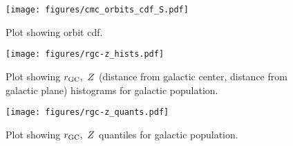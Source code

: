 \documentclass[twocolumn]{aastex631}
\begin{document}
\begin{figure}
    \begin{centering}
        \texttt{[image: figures/cmc\_orbits\_cdf\_S.pdf]}
        \caption{
            Plot showing orbit cdf.
        }
        \label{fig:cmc_orbits_cdf}
    \end{centering}
\end{figure}

\begin{figure}
    \begin{centering}
        \texttt{[image: figures/rgc-z\_hists.pdf]}
        \caption{
            Plot showing $r_{\rm GC},\ Z$ (distance from galactic center, distance from galactic plane) histograms for galactic population.
        }
        \label{fig:rgc-z_hists}
    \end{centering}
\end{figure}

\begin{figure}
    \begin{centering}
        \texttt{[image: figures/rgc-z\_quants.pdf]}
        \caption{
            Plot showing $r_{\rm GC},\ Z$ quantiles for galactic population.
        }
        \label{fig:rgc-z_quants}
    \end{centering}
\end{figure}


\end{document}
